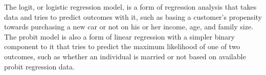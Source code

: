 The logit, or logistic regression model, is a form of regression analysis that takes data and tries to predict outcomes with it, such as basing a customer's propensity towards purchasing a new car or not on his or her income, age, and family size. The probit model is also a form of linear regression with a simpler binary component to it that tries to predict the maximum likelihood of one of two outcomes, such as whether an individual is married or not based on available probit regression data.
